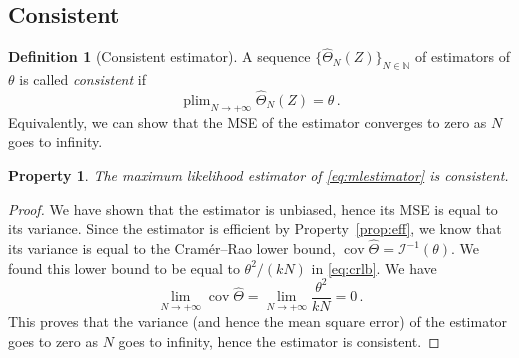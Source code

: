 \documentclass[final]{aomart}
\newtheorem[{}\it]{thm}{Theorem}[section]
\newtheorem{prop}[thm]{Property}
\theoremstyle{definition}
\newtheorem{defn}{Definition}[section]
\newtheorem*[{}\it]{notation}{Notation}
\numberwithin{equation}{section}
\newcommand{\wh}{\widehat}
\newcommand{\hTheta}{\wh{\Theta}} %
\newcommand{\fisher}{\mathcal{I}} %
\DeclareMathOperator{\cov}{cov}
\DeclareMathOperator*{\plim}{plim}
\begin{document}
\subsection{Consistent}
\begin{defn}[Consistent estimator]
	A sequence \(\{\hTheta_N(Z)\}_{N \in \mathbb{N}}\) of estimators of \(\theta\) is called \emph{consistent} if
	\begin{equation}
	\plim_{N \to +\infty} \hTheta_N(Z) = \theta\,.
	\end{equation}
	Equivalently, we can show that the MSE of the estimator converges to zero as \(N\) goes to infinity.
\end{defn}
\begin{prop}
	The maximum likelihood estimator of \eqref{eq:mlestimator} is consistent.
\end{prop}
\begin{proof}
	We have shown that the estimator is unbiased, hence its MSE is equal to its variance.
	Since the estimator is efficient by Property~\ref{prop:eff}, we know that its variance is equal to the Cramér--Rao lower bound, \(\cov \hTheta = \fisher^{-1}(\theta)\).
	We found this lower bound to be equal to \(\theta^2/(kN)\) in \eqref{eq:crlb}.
	We have
	\begin{equation}
	\lim_{N \to +\infty} \cov \hTheta = \lim_{N \to +\infty} \frac{\theta^2}{kN} = 0\,.
	\end{equation}
	This proves that the variance (and hence the mean square error) of the estimator goes to zero as \(N\) goes to infinity, hence the estimator is consistent.
\end{proof}
\end{document}
